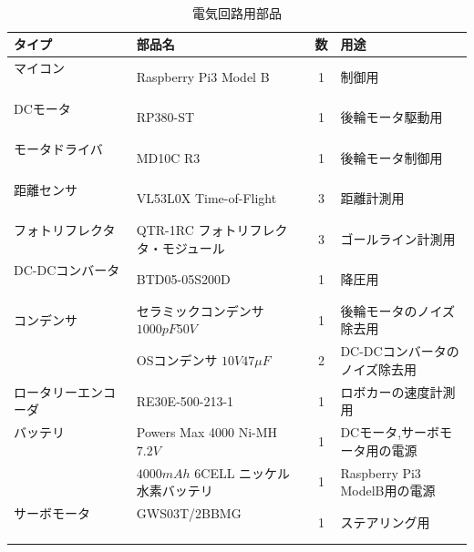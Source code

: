 \begin{table}
　   \caption{電気回路用部品}
　   \label{tab::circuit_parts}
　   \begin{center}
　   \footnotesize
　　　\begin{tabular}{ | l | l | c || l |}\hline
タイプ          　　　　　&部品名              　　　                        &数&用途   \\ \hline\hline
マイコン        　　　　　&Raspberry Pi3 Model B    　                       &1&制御用          　\\ \hline
DCモータ        　　　　　&RP380-ST    　　　　　　　　                      &1&後輪モータ駆動用   \\    \hline
モータドライバ        　　&MD10C R3   　　                                   &1&後輪モータ制御用   \\ \hline
距離センサ        　　　　&VL53L0X Time-of-Flight 　                         &3&距離計測用   \\ \hline
フォトリフレクタ        　&QTR-1RC フォトリフレクタ・モジュール              &3&ゴールライン計測用   \\ \hline
DC-DCコンバータ        　 &BTD05-05S200D                                     &1&降圧用   \\ \hline
コンデンサ                &セラミックコンデンサ$1000\unit{pF}50\unit{V}$ &1&後輪モータのノイズ除去用   \\ \cline{2-4}
                          &OSコンデンサ $10\unit{V}47\unit{\mu F}$                          &2&DC-DCコンバータのノイズ除去用    \\ \hline
ロータリーエンコーダ　　　&RE30E-500-213-1                                   &1&ロボカーの速度計測用   \\ \hline
バッテリ        　　　　　&Powers Max 4000 Ni-MH $7.2\unit{V}$                        &1&DCモータ,サーボモータ用の電源\\ \cline{2-4}
                          &$4000\unit{mAh}$ 6CELL ニッケル水素バッテリ                &1&Raspberry Pi3 ModelB用の電源    \\ \hline
サーボモータ        　　　&GWS03T/2BBMG 　　　　　　　　                      　&1&ステアリング用   \\    \hline
 
	   \end{tabular} 
	\end{center}
\end{table}


\newpage

